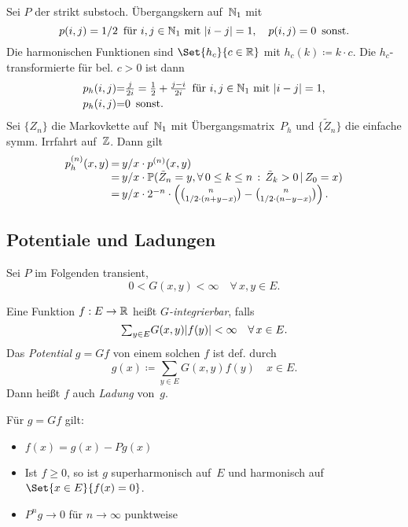 \documentclass{cheat-sheet}
\renewcommand{\P}{\mathbb{P}} %
\begin{document}
\begin{bsp}
  Sei $P$ der strikt substoch. Übergangskern auf~$\mathbb{N}_1$ mit
  \[
    p(i, j) = 1/2 \enspace \text{für $i, j \in \mathbb{N}_1$ mit $\lvert i - j\rvert = 1$}, \quad
    p(i, j) = 0 \enspace \text{sonst.}
  \]
  Die harmonischen Funktionen sind $\Set{h_c}{c \in \R}$ mit $h_c(k) \coloneqq k \cdot c$.
  Die $h_c$-transformierte für bel. $c > 0$ ist dann
  \[
    \arraycolsep=0pt
    \begin{array}{r c l}
      p_h(i, j) &=& \tfrac{j}{2i} = \tfrac{1}{2} + \tfrac{j - i}{2i} \enspace \text{für $i, j \in \N_1$ mit $\abs{i - j} = 1$}, \\[0.2em]
      p_h(i, j) &=& 0 \enspace \text{sonst.}
    \end{array}
  \]
  Sei $\{ Z_n \}$ die Markovkette auf~$\mathbb{N}_1$ mit Übergangsmatrix~$P_h$ und $\{ \tilde{Z}_n \}$ die einfache symm. Irrfahrt auf~$\mathbb{Z}$.
  Dann gilt
  \[
    \arraycolsep=1pt
    \begin{array}{r c l}
      p_h^{(n)}(x, y)
        &=& y/x \cdot p^{(n)}(x, y) \\
        &=& y/x \cdot \P(\tilde{Z}_n = y, \fa{0 \leq k \leq n} \tilde{Z}_k > 0 \,|\, Z_0 = x) \\
        &=& y/x \cdot 2^{-n} \cdot \left( \binom{n}{1/2 \cdot (n + y - x)} - \binom{n}{1/2 \cdot (n - y - x)} \right).
    \end{array}
  \]
\end{bsp}

\subsection{Potentiale und Ladungen}

Sei $P$ im Folgenden transient, \dh{}
\[
  0 < G(x, y) < \infty \quad
  \forall \, x, y \in E.
\]

\begin{defn}
  Eine Funktion $f : E \to \mathbb{R}$ heißt \emph{$G$-integrierbar}, falls
  \[
    {\sum}_{y \in E} G(x, y) \abs{f(y)} < \infty \quad
    \forall \, x \in E.
  \]
  Das \emph{Potential} $g = Gf$ von einem solchen $f$ ist def. durch
  \[
    g(x) \coloneqq {\sum}_{y \in E} G(x, y) f(y) \quad x \in E.
  \]
  Dann heißt $f$ auch \emph{Ladung} von~$g$.
\end{defn}

\begin{lem}
  Für $g = G f$ gilt:
  \begin{itemize}
    \item $f(x) = g(x) - P g(x)$
    \item Ist $f \geq 0$, so ist $g$ superharmonisch auf~$E$ und harmonisch auf $\Set{x \in E}{f(x) = 0}$.
    \item $P^n g \to 0$ für $n \to \infty$ punktweise
  \end{itemize}
\end{lem}
\end{document}
